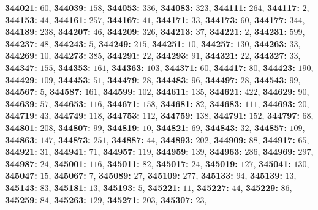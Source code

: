 \textsf{\bfseries 344021:} $60$, \textsf{\bfseries 344039:} $158$, \textsf{\bfseries 344053:} $336$, \textsf{\bfseries 344083:} $323$, \textsf{\bfseries 344111:} $264$, \textsf{\bfseries 344117:} $2$, \textsf{\bfseries 344153:} $44$, \textsf{\bfseries 344161:} $257$, \textsf{\bfseries 344167:} $41$, \textsf{\bfseries 344171:} $33$, \textsf{\bfseries 344173:} $60$, \textsf{\bfseries 344177:} $344$, \textsf{\bfseries 344189:} $238$, \textsf{\bfseries 344207:} $46$, \textsf{\bfseries 344209:} $326$, \textsf{\bfseries 344213:} $37$, \textsf{\bfseries 344221:} $2$, \textsf{\bfseries 344231:} $599$, \textsf{\bfseries 344237:} $48$, \textsf{\bfseries 344243:} $5$, \textsf{\bfseries 344249:} $215$, \textsf{\bfseries 344251:} $10$, \textsf{\bfseries 344257:} $130$, \textsf{\bfseries 344263:} $33$, \textsf{\bfseries 344269:} $10$, \textsf{\bfseries 344273:} $385$, \textsf{\bfseries 344291:} $22$, \textsf{\bfseries 344293:} $91$, \textsf{\bfseries 344321:} $22$, \textsf{\bfseries 344327:} $33$, \textsf{\bfseries 344347:} $155$, \textsf{\bfseries 344353:} $161$, \textsf{\bfseries 344363:} $103$, \textsf{\bfseries 344371:} $60$, \textsf{\bfseries 344417:} $80$, \textsf{\bfseries 344423:} $190$, \textsf{\bfseries 344429:} $109$, \textsf{\bfseries 344453:} $51$, \textsf{\bfseries 344479:} $28$, \textsf{\bfseries 344483:} $96$, \textsf{\bfseries 344497:} $28$, \textsf{\bfseries 344543:} $99$, \textsf{\bfseries 344567:} $5$, \textsf{\bfseries 344587:} $161$, \textsf{\bfseries 344599:} $102$, \textsf{\bfseries 344611:} $135$, \textsf{\bfseries 344621:} $422$, \textsf{\bfseries 344629:} $90$, \textsf{\bfseries 344639:} $57$, \textsf{\bfseries 344653:} $116$, \textsf{\bfseries 344671:} $158$, \textsf{\bfseries 344681:} $82$, \textsf{\bfseries 344683:} $111$, \textsf{\bfseries 344693:} $20$, \textsf{\bfseries 344719:} $43$, \textsf{\bfseries 344749:} $118$, \textsf{\bfseries 344753:} $112$, \textsf{\bfseries 344759:} $138$, \textsf{\bfseries 344791:} $152$, \textsf{\bfseries 344797:} $68$, \textsf{\bfseries 344801:} $208$, \textsf{\bfseries 344807:} $99$, \textsf{\bfseries 344819:} $10$, \textsf{\bfseries 344821:} $69$, \textsf{\bfseries 344843:} $32$, \textsf{\bfseries 344857:} $109$, \textsf{\bfseries 344863:} $147$, \textsf{\bfseries 344873:} $251$, \textsf{\bfseries 344887:} $44$, \textsf{\bfseries 344893:} $202$, \textsf{\bfseries 344909:} $88$, \textsf{\bfseries 344917:} $65$, \textsf{\bfseries 344921:} $31$, \textsf{\bfseries 344941:} $71$, \textsf{\bfseries 344957:} $119$, \textsf{\bfseries 344959:} $139$, \textsf{\bfseries 344963:} $286$, \textsf{\bfseries 344969:} $297$, \textsf{\bfseries 344987:} $24$, \textsf{\bfseries 345001:} $116$, \textsf{\bfseries 345011:} $82$, \textsf{\bfseries 345017:} $24$, \textsf{\bfseries 345019:} $127$, \textsf{\bfseries 345041:} $130$, \textsf{\bfseries 345047:} $15$, \textsf{\bfseries 345067:} $7$, \textsf{\bfseries 345089:} $27$, \textsf{\bfseries 345109:} $277$, \textsf{\bfseries 345133:} $94$, \textsf{\bfseries 345139:} $13$, \textsf{\bfseries 345143:} $83$, \textsf{\bfseries 345181:} $13$, \textsf{\bfseries 345193:} $5$, \textsf{\bfseries 345221:} $11$, \textsf{\bfseries 345227:} $44$, \textsf{\bfseries 345229:} $86$, \textsf{\bfseries 345259:} $84$, \textsf{\bfseries 345263:} $129$, \textsf{\bfseries 345271:} $203$, \textsf{\bfseries 345307:} $23$, 
